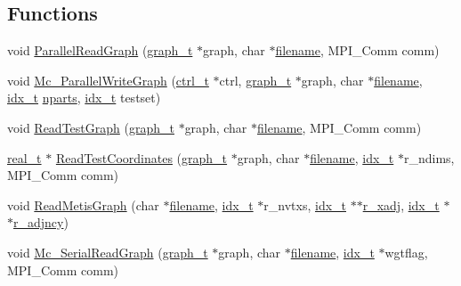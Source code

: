 \subsection*{Functions}
\begin{DoxyCompactItemize}
\item 
void \hyperlink{a00861_abcd3804c62bf4464f2c8de37a42e6ef8}{Parallel\+Read\+Graph} (\hyperlink{a00734}{graph\+\_\+t} $\ast$graph, char $\ast$\hyperlink{a00623_a42a21beb8018ac623f4d09db1343b9cf}{filename}, M\+P\+I\+\_\+\+Comm comm)
\item 
void \hyperlink{a00861_a13a98ce22f397ea58e35b30ea012a6a0}{Mc\+\_\+\+Parallel\+Write\+Graph} (\hyperlink{a00742}{ctrl\+\_\+t} $\ast$ctrl, \hyperlink{a00734}{graph\+\_\+t} $\ast$graph, char $\ast$\hyperlink{a00623_a42a21beb8018ac623f4d09db1343b9cf}{filename}, \hyperlink{a00876_aaa5262be3e700770163401acb0150f52}{idx\+\_\+t} \hyperlink{a00879_aad88065af88fd6759101788a8e15ce9e}{nparts}, \hyperlink{a00876_aaa5262be3e700770163401acb0150f52}{idx\+\_\+t} testset)
\item 
void \hyperlink{a00861_a248f280836966f501ed8ecceb1b32a4a}{Read\+Test\+Graph} (\hyperlink{a00734}{graph\+\_\+t} $\ast$graph, char $\ast$\hyperlink{a00623_a42a21beb8018ac623f4d09db1343b9cf}{filename}, M\+P\+I\+\_\+\+Comm comm)
\item 
\hyperlink{a00876_a1924a4f6907cc3833213aba1f07fcbe9}{real\+\_\+t} $\ast$ \hyperlink{a00861_a4c1a88b3f492be37fe35e779692fb84c}{Read\+Test\+Coordinates} (\hyperlink{a00734}{graph\+\_\+t} $\ast$graph, char $\ast$\hyperlink{a00623_a42a21beb8018ac623f4d09db1343b9cf}{filename}, \hyperlink{a00876_aaa5262be3e700770163401acb0150f52}{idx\+\_\+t} $\ast$r\+\_\+ndims, M\+P\+I\+\_\+\+Comm comm)
\item 
void \hyperlink{a00861_a4ff02bbc05033b431cc3b60bc2f2a1a4}{Read\+Metis\+Graph} (char $\ast$\hyperlink{a00623_a42a21beb8018ac623f4d09db1343b9cf}{filename}, \hyperlink{a00876_aaa5262be3e700770163401acb0150f52}{idx\+\_\+t} $\ast$r\+\_\+nvtxs, \hyperlink{a00876_aaa5262be3e700770163401acb0150f52}{idx\+\_\+t} $\ast$$\ast$\hyperlink{a00879_ab92af26e448291b7932687dee45298df}{r\+\_\+xadj}, \hyperlink{a00876_aaa5262be3e700770163401acb0150f52}{idx\+\_\+t} $\ast$$\ast$\hyperlink{a00879_ad0152ea85617e06eb0e2d9f386150411}{r\+\_\+adjncy})
\item 
void \hyperlink{a00861_a51cf512b2713a4b6397016836e9e653e}{Mc\+\_\+\+Serial\+Read\+Graph} (\hyperlink{a00734}{graph\+\_\+t} $\ast$graph, char $\ast$\hyperlink{a00623_a42a21beb8018ac623f4d09db1343b9cf}{filename}, \hyperlink{a00876_aaa5262be3e700770163401acb0150f52}{idx\+\_\+t} $\ast$wgtflag, M\+P\+I\+\_\+\+Comm comm)

\end{DoxyCompactItemize}
